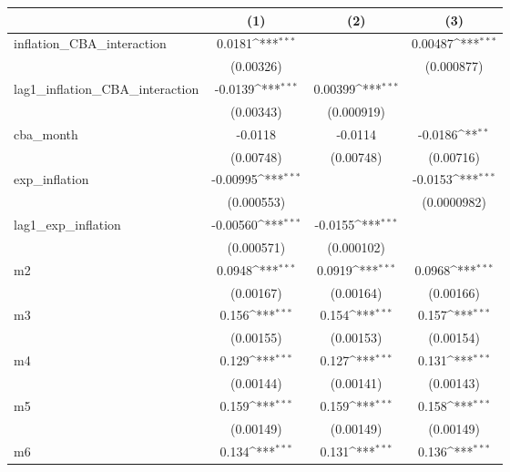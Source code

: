 {
\def\sym#1{\ifmmode^{#1}\else\(^{#1}\)\fi}
\begin{tabular}{l*{3}{c}}
\hline\hline
            &\multicolumn{1}{c}{(1)}         &\multicolumn{1}{c}{(2)}         &\multicolumn{1}{c}{(3)}         \\
\hline
inflation\_CBA\_interaction&      0.0181\sym{***}&                     &     0.00487\sym{***}\\
            &   (0.00326)         &                     &  (0.000877)         \\
lag1\_inflation\_CBA\_interaction&     -0.0139\sym{***}&     0.00399\sym{***}&                     \\
            &   (0.00343)         &  (0.000919)         &                     \\
cba\_month   &     -0.0118         &     -0.0114         &     -0.0186\sym{**} \\
            &   (0.00748)         &   (0.00748)         &   (0.00716)         \\
exp\_inflation&    -0.00995\sym{***}&                     &     -0.0153\sym{***}\\
            &  (0.000553)         &                     & (0.0000982)         \\
lag1\_exp\_inflation&    -0.00560\sym{***}&     -0.0155\sym{***}&                     \\
            &  (0.000571)         &  (0.000102)         &                     \\
m2          &      0.0948\sym{***}&      0.0919\sym{***}&      0.0968\sym{***}\\
            &   (0.00167)         &   (0.00164)         &   (0.00166)         \\
m3          &       0.156\sym{***}&       0.154\sym{***}&       0.157\sym{***}\\
            &   (0.00155)         &   (0.00153)         &   (0.00154)         \\
m4          &       0.129\sym{***}&       0.127\sym{***}&       0.131\sym{***}\\
            &   (0.00144)         &   (0.00141)         &   (0.00143)         \\
m5          &       0.159\sym{***}&       0.159\sym{***}&       0.158\sym{***}\\
            &   (0.00149)         &   (0.00149)         &   (0.00149)         \\
m6          &       0.134\sym{***}&       0.131\sym{***}&       0.136\sym{***}\\

\end{tabular}}
